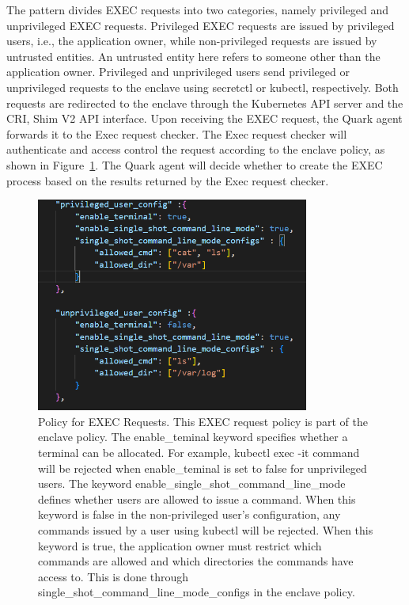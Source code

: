 The pattern divides EXEC requests into two categories, namely privileged and unprivileged EXEC requests. Privileged EXEC requests are issued by privileged users, i.e., the application owner, while non-privileged requests are issued by untrusted 
entities. An untrusted entity here refers to someone other than the application owner. Privileged and unprivileged users send privileged or unprivileged requests to the enclave using secretctl or kubectl, respectively. Both requests are redirected 
to the enclave through the Kubernetes  API server and the CRI, Shim V2 API interface. Upon receiving the EXEC request, the Quark agent forwards it to the Exec request checker. The Exec request checker will authenticate and access control the request 
according to the enclave policy, as shown in Figure~\ref{fig:exec_policy}. The Quark agent will decide whether to create the EXEC process based on the results returned by the Exec request checker.
\begin{figure}[htp]
    \centering
    \includegraphics[width=0.8\textwidth]{images/exec_policy.png}
    \caption[Policy for EXEC Requests]{Policy for EXEC Requests. This EXEC request policy is part of the enclave policy. The enable\_teminal keyword specifies whether a terminal can be 
    allocated. For example, kubectl exec -it command will be rejected when enable\_teminal is set to false for unprivileged users. The keyword enable\_single\_shot\_command\_line\_mode 
    defines whether users are allowed to issue a command. When this keyword is false in the non-privileged user's configuration, any commands issued by a user using kubectl will be 
    rejected. When this keyword is true, the application owner must restrict which commands are allowed and which directories the commands have access to. This is done through single\_shot\_command\_line\_mode\_configs in the enclave policy.}
    \label{fig:exec_policy}
\end{figure}




